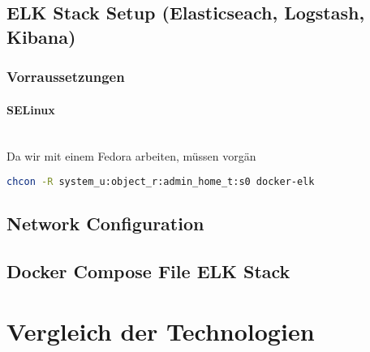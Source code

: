 \subsection{ELK Stack Setup (Elasticseach, Logstash, Kibana)}
\subsubsection{Vorraussetzungen}
\paragraph{SELinux} \hfill \\
Da wir mit einem Fedora arbeiten, müssen vorgän
\begin{lstlisting}[language=bash]
chcon -R system_u:object_r:admin_home_t:s0 docker-elk
\end{lstlisting}



\subsection{Network Configuration}

\subsection{Docker Compose File ELK Stack}




\section{Vergleich der Technologien}



